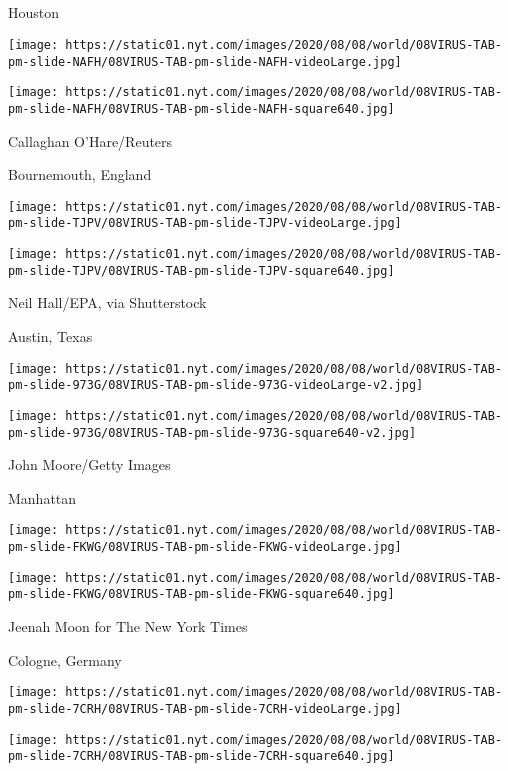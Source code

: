 \hypertarget{section}{%
\subsection{}\label{section}}

\href{https://www.nytimes.com/2020/08/07/world/coronavirus-covid-19.html}{}

Houston

\texttt{[image: https://static01.nyt.com/images/2020/08/08/world/08VIRUS-TAB-pm-slide-NAFH/08VIRUS-TAB-pm-slide-NAFH-videoLarge.jpg]}

\texttt{[image: https://static01.nyt.com/images/2020/08/08/world/08VIRUS-TAB-pm-slide-NAFH/08VIRUS-TAB-pm-slide-NAFH-square640.jpg]}

Callaghan O'Hare/Reuters

Bournemouth, England

\texttt{[image: https://static01.nyt.com/images/2020/08/08/world/08VIRUS-TAB-pm-slide-TJPV/08VIRUS-TAB-pm-slide-TJPV-videoLarge.jpg]}

\texttt{[image: https://static01.nyt.com/images/2020/08/08/world/08VIRUS-TAB-pm-slide-TJPV/08VIRUS-TAB-pm-slide-TJPV-square640.jpg]}

Neil Hall/EPA, via Shutterstock

Austin, Texas

\texttt{[image: https://static01.nyt.com/images/2020/08/08/world/08VIRUS-TAB-pm-slide-973G/08VIRUS-TAB-pm-slide-973G-videoLarge-v2.jpg]}

\texttt{[image: https://static01.nyt.com/images/2020/08/08/world/08VIRUS-TAB-pm-slide-973G/08VIRUS-TAB-pm-slide-973G-square640-v2.jpg]}

John Moore/Getty Images

Manhattan

\texttt{[image: https://static01.nyt.com/images/2020/08/08/world/08VIRUS-TAB-pm-slide-FKWG/08VIRUS-TAB-pm-slide-FKWG-videoLarge.jpg]}

\texttt{[image: https://static01.nyt.com/images/2020/08/08/world/08VIRUS-TAB-pm-slide-FKWG/08VIRUS-TAB-pm-slide-FKWG-square640.jpg]}

Jeenah Moon for The New York Times

Cologne, Germany

\texttt{[image: https://static01.nyt.com/images/2020/08/08/world/08VIRUS-TAB-pm-slide-7CRH/08VIRUS-TAB-pm-slide-7CRH-videoLarge.jpg]}

\texttt{[image: https://static01.nyt.com/images/2020/08/08/world/08VIRUS-TAB-pm-slide-7CRH/08VIRUS-TAB-pm-slide-7CRH-square640.jpg]}

